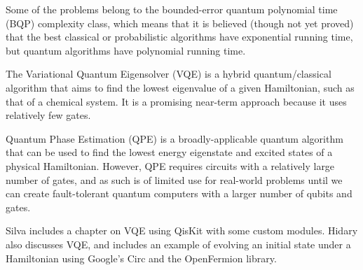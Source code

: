 \documentclass[12pt]{extarticle}
\begin{document}
Some of the problems belong to the bounded-error quantum polynomial time (BQP) complexity class,
which means that it is believed (though not yet proved) that the best classical or probabilistic algorithms have exponential running time,
but quantum algorithms have polynomial running time.

The Variational Quantum Eigensolver (VQE) is a hybrid quantum/classical algorithm that aims to find the lowest eigenvalue of a given Hamiltonian, such as that of a chemical system.
It is a promising near-term approach because it uses relatively few gates.

Quantum Phase Estimation (QPE) is a broadly-applicable quantum algorithm that can be used to find the lowest energy eigenstate and excited states of a physical Hamiltonian.
However, QPE requires circuits with a relatively large number of gates, and as such is of limited use for real-world problems until we can create fault-tolerant quantum computers with a larger number of qubits and gates.

Silva\cite{silva2024} includes a chapter on VQE using QisKit with some custom modules.
Hidary\cite{hidary2021} also discusses VQE, and includes an example of evolving an initial state under a Hamiltonian using Google's Circ and the OpenFermion library.


\printbibliography
{}
\end{document}
